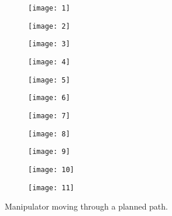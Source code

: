 \begin{figure}
    \centering
    \begin{subfigure}[b]{0.25\textwidth}
    	\texttt{[image: 1]}

   	 \end{subfigure}
   	 \quad
    \begin{subfigure}[b]{0.25\textwidth}
		\texttt{[image: 2]}

    \end{subfigure}
    \quad %
    \begin{subfigure}[b]{0.25\textwidth}
        \texttt{[image: 3]}

    \end{subfigure}
    \quad
    \begin{subfigure}[b]{0.25\textwidth}
       	\texttt{[image: 4]}

   \end{subfigure}
    \quad
    \begin{subfigure}[b]{0.25\textwidth}
        \texttt{[image: 5]}

    \end{subfigure}
    \quad
   	\begin{subfigure}[b]{0.25\textwidth}
        \texttt{[image: 6]}
    
   \end{subfigure}
   \quad
   \begin{subfigure}[b]{0.25\textwidth}
       \texttt{[image: 7]}
        
   \end{subfigure}
   \quad
    \begin{subfigure}[b]{0.25\textwidth}
        \texttt{[image: 8]}

    \end{subfigure}
    \quad
    \begin{subfigure}[b]{0.25\textwidth}
        \texttt{[image: 9]}

    \end{subfigure}
    \quad
    \begin{subfigure}[b]{0.25\textwidth}
        \texttt{[image: 10]}

    \end{subfigure}
    \quad
    \begin{subfigure}[b]{0.25\textwidth}
        \texttt{[image: 11]}

    \end{subfigure}
    \quad
 	\caption{Manipulator moving through a planned path. }
 	\label{fig:images}
\end{figure}